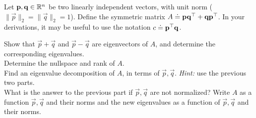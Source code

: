 
Let $\mathbf{p},\mathbf{q} \in \mathbb{R}^{n}$ be two linearly independent vectors, with unit norm ($\|\vec{p}\|_2 = \|\vec{q}\|_2 = 1$). Define the symmetric matrix $A\doteq \mathbf{p}\mathbf{q}^{\top}+\mathbf{q}\mathbf{p}^{\top}$. In your derivations, it may be useful to use the notation $c \doteq  \mathbf{p}^{\top} \mathbf{q}$.
\begin{enumerate}
\qitem Show that $\vec{p}+\vec{q}$ and $\vec{p}-\vec{q}$ are eigenvectors of $A$, and determine the corresponding eigenvalues.\\
\sol{
 
}
\qitem Determine the nullspace and rank of $A$. \\
\sol{
 
}
\qitem Find an eigenvalue decomposition of $A$, in terms of $\vec{p},\vec{q}$. \emph{Hint:} use the previous two parts.\\
\sol{
 
}
\qitem What is the answer to the previous part if $\vec{p},\vec{q}$ are not normalized? Write $A$ as a function $\vec{p},\vec{q}$ and their norms and the new eigenvalues as a function of $\vec{p},\vec{q}$ and their norms.

\sol{
 
}
\end{enumerate}
